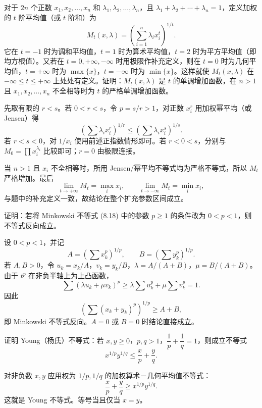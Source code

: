 \begin{xexercise}[8]
对于 $2n$ 个正数 $x_1,x_2,\ldots,x_n$ 和 $\lambda_1,\lambda_2,\ldots,\lambda_n$，且 $\lambda_1+\lambda_2+\cdots+\lambda_n=1$，定义加权的 $t$ 阶平均值（或 $t$ 阶和）为
  \[
    M_t(x,\lambda)=\left(\sum_{i=1}^n\lambda_i x_i^t\right)^{1/t}.
  \]
  它在 $t=-1$ 时为调和平均值，$t=1$ 时为算术平均值，$t=2$ 时为平方平均值（即均方根值）。又若在 $t=0,+\infty,-\infty$ 时用极限作补充定义，则在 $t=0$ 时为几何平均值，$t=+\infty$ 时为 $\max\{x\}$，$t=-\infty$ 时为 $\min\{x\}$。这样就使 $M_t(x,\lambda)$ 在 $-\infty\le t\le+\infty$ 上处处有定义。证明：$M_t(x,\lambda)$ 是 $t$ 的单调增加函数，在 $n>1$ 且 $x_1,x_2,\ldots,x_n$ 不全相等时为 $t$ 的严格单调增加函数。
\end{xexercise}
\begin{xsolution}
先取有限的 $r<s$。若 $0<r<s$，令 $p=s/r>1$，对正数 $x_i^r$ 用加权幂平均（或 Jensen）得
\[
  \left(\sum\lambda_i x_i^r\right)^{1/r}
  \le
  \left(\sum\lambda_i x_i^s\right)^{1/s}.
\]
若 $r<s<0$，对 $1/x_i$ 使用前述正指数情形即可。若 $r<0<s$，分别与 $M_0=\prod x_i^{\lambda_i}$ 比较即可；$r=0$ 由极限连接。

当 $n>1$ 且 $x_i$ 不全相等时，所用 Jensen/幂平均不等式均为严格不等式，所以 $M_t$ 严格增加。最后
\[
  \lim_{t\to+\infty}M_t=\max_i x_i,
  \qquad
  \lim_{t\to-\infty}M_t=\min_i x_i,
\]
与题中的补充定义一致，故结论在整个扩充参数区间成立。
\end{xsolution}


\begin{xexercise}[9]
证明：若将 Minkowski 不等式 (8.18) 中的参数 $p\ge1$ 的条件改为 $0<p<1$，则不等式反向成立。
\end{xexercise}
\begin{xsolution}
设 $0<p<1$，并记
\[
  A=\left(\sum x_k^p\right)^{1/p},
  \qquad
  B=\left(\sum y_k^p\right)^{1/p}.
\]
若 $A,B>0$，令 $u_k=x_k/A$，$v_k=y_k/B$，$\lambda=A/(A+B)$，$\mu=B/(A+B)$。由于 $t^p$ 在非负半轴上为上凸函数，
\[
  \sum(\lambda u_k+\mu v_k)^p
  \ge\lambda\sum u_k^p+\mu\sum v_k^p=1.
\]
因此
\[
  \left(\sum(x_k+y_k)^p\right)^{1/p}\ge A+B,
\]
即 Minkowski 不等式反向。$A=0$ 或 $B=0$ 时结论直接成立。
\end{xsolution}


\begin{xexercise}[10]
证明 Young（杨氏）不等式：若 $x,y\ge0$，$p,q>1$，$\dfrac1p+\dfrac1q=1$，则成立不等式
  \[
    x^{1/p}y^{1/q}\le\frac xp+\frac yq.
  \]
\end{xexercise}
\begin{xsolution}
对非负数 $x,y$ 应用权为 $1/p,1/q$ 的加权算术－几何平均值不等式：
\[
  \frac xp+\frac yq
  \ge x^{1/p}y^{1/q}.
\]
这就是 Young 不等式。等号当且仅当 $x=y$。
\end{xsolution}


